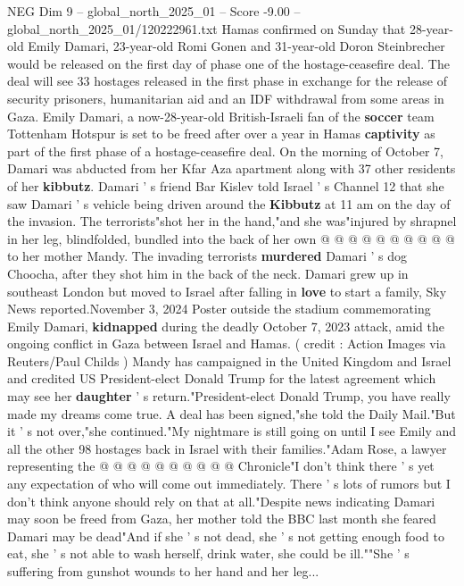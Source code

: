 \begin{textsample}{NEG Dim 9 – global\_north\_2025\_01 – Score -9.00 – global\_north\_2025\_01/120222961.txt}  \label{ex:f9_neg_029}
Hamas confirmed on Sunday that 28-year-old Emily Damari, 23-year-old Romi Gonen and 31-year-old Doron Steinbrecher would be released on the first day of phase one of the hostage-ceasefire deal.
The deal will see 33 hostages released in the first phase in exchange for the release of security prisoners, humanitarian aid and an IDF withdrawal from some areas in Gaza.
Emily Damari, a now-28-year-old British-Israeli fan of the \textbf{soccer} team Tottenham Hotspur is set to be freed after over a year in Hamas \textbf{captivity} as part of the first phase of a hostage-ceasefire deal.
On the morning of October 7, Damari was abducted from her Kfar Aza apartment along with 37 other residents of her \textbf{kibbutz}.
Damari ' s friend Bar Kislev told Israel ' s Channel 12 that she saw Damari ' s vehicle being driven around the \textbf{Kibbutz} at 11 am on the day of the invasion.
The terrorists"shot her in the hand,"and she was"injured by shrapnel in her leg, blindfolded, bundled into the back of her own @ @ @ @ @ @ @ @ @ @ to her mother Mandy.
The invading terrorists \textbf{murdered} Damari ' s dog Choocha, after they shot him in the back of the neck.
Damari grew up in southeast London but moved to Israel after falling in \textbf{love} to start a family, Sky News reported.November 3, 2024 Poster outside the stadium commemorating Emily Damari, \textbf{kidnapped} during the deadly October 7, 2023 attack, amid the ongoing conflict in Gaza between Israel and Hamas. ( credit : Action Images via Reuters/Paul Childs ) Mandy has campaigned in the United Kingdom and Israel and credited US President-elect Donald Trump for the latest agreement which may see her \textbf{daughter} ' s return."President-elect Donald Trump, you have really made my dreams come true.
A deal has been signed,"she told the Daily Mail."But it ' s not over,"she continued."My nightmare is still going on until I see Emily and all the other 98 hostages back in Israel with their families."Adam Rose, a lawyer representing the @ @ @ @ @ @ @ @ @ @ Chronicle"I don't think there ' s yet any expectation of who will come out immediately.
There ' s lots of rumors but I don't think anyone should rely on that at all."Despite news indicating Damari may soon be freed from Gaza, her mother told the BBC last month she feared Damari may be dead"And if she ' s not dead, she ' s not getting enough food to eat, she ' s not able to wash herself, drink water, she could be ill.""She ' s suffering from gunshot wounds to her hand and her leg...

\end{textsample}
